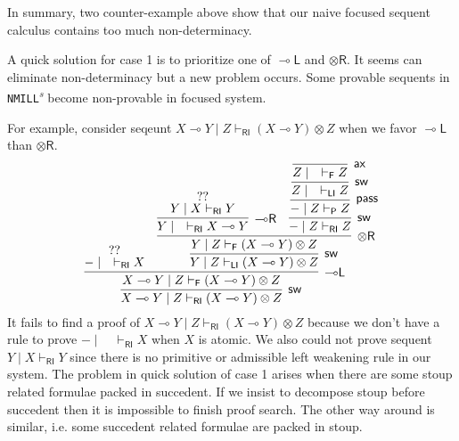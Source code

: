 \documentclass[submission,copyright,creativecommons]{eptcs}
\theoremstyle{definition}
\newcommand{\tr}{\otimes \mathsf{R}}
\newcommand{\lright}{{\multimap}\mathsf{R}}
\newcommand{\lleft}{{\multimap}\mathsf{L}}
\newcommand{\pass}{\mathsf{pass}}
\newcommand{\ax}{\mathsf{ax}}
\newcommand{\ot}{\otimes}
\newcommand{\lolli}{\multimap}
\newcommand{\RI}{\mathsf{RI}}
\newcommand{\LI}{\mathsf{LI}}
\newcommand{\Pass}{\mathsf{P}}
\newcommand{\F}{\mathsf{F}}
\newcommand{\NMILL}{\texttt{NMILL}}
\newcommand{\SkNMILL}{\NMILL\textsuperscript{\textit{s}}}
\begin{document}
In summary, two counter-example above show that our naive focused sequent calculus contains too much non-determinacy.

A quick solution for case 1 is to prioritize one of $\lleft$ and $\tr$.
It seems can eliminate non-determinacy but a new problem occurs.
Some provable sequents in \SkNMILL \text{ } become non-provable in focused system.

For example, consider seqeunt $X \lolli Y \mid Z \vdash_{\RI} (X \lolli Y) \ot Z$ when we favor $\lleft$ than $\tr$.
\begin{displaymath}
  \infer[\mathsf{sw}]{X \lolli Y \mid Z \vdash_{\RI} (X \lolli Y) \ot Z}{
    \infer[\lleft]{X \lolli Y \mid Z \vdash_{\F} (X \lolli Y) \ot Z}{
      \deduce{- \mid \quad \vdash_{\RI} X}{??}
      &
      \infer[\mathsf{sw}]{Y \mid Z \vdash_{\LI} (X \lolli Y) \ot Z}{
        \infer[\tr]{Y \mid Z \vdash_{\F} (X \lolli Y) \ot Z}{
          \infer[\lright]{Y \mid \quad \vdash_{\RI} X \lolli Y}{
            \deduce{Y \mid X \vdash_{\RI} Y}{??}
          }
          &
          \infer[\mathsf{sw}]{- \mid Z \vdash_{\RI} Z}{
            \infer[\pass]{- \mid Z \vdash_{\Pass} Z}{
              \infer[\mathsf{sw}]{Z \mid \quad \vdash_{\LI} Z}{
                \infer[\ax]{Z \mid \quad \vdash_{\F} Z}{}
              }
            }
          }
        }
      }
    }
  }
\end{displaymath}
It fails to find a proof of $X \lolli Y \mid Z \vdash_{\RI} (X \lolli Y) \ot Z$ because we don't have a rule to prove $- \mid \quad \vdash_{\RI} X$ when $X$ is atomic.
We also could not prove sequent $Y \mid X \vdash_{\RI} Y$ since there is no primitive or admissible left weakening rule in our system.
The problem in quick solution of case 1 arises when there are some stoup related formulae packed in succedent.
If we insist to decompose stoup before succedent then it is impossible to finish proof search.
The other way around is similar, i.e. some succedent related formulae are packed in stoup.
\end{document}
